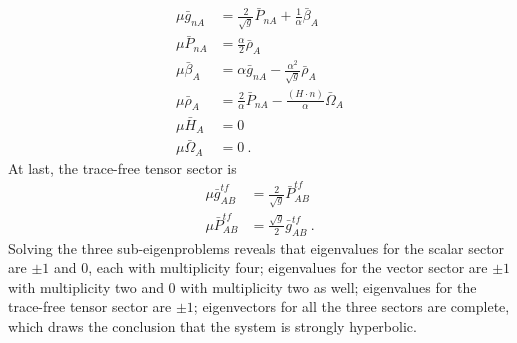 \begin{subequations}
\begin{align}
\mu {\bar g}_{nA} & = \frac{2}{\sqrt{g}}{\bar P}_{nA} + \frac{1}{\alpha}{\bar \beta}_{A}\\
\mu {\bar P}_{nA} & = \frac{\alpha}{2}{\bar \rho}_{A}\\
\mu {\bar \beta}_{A} & = \alpha {\bar g}_{nA} - \frac{\alpha^{2}}{\sqrt{g}}{\bar \rho}_{A}\\
\mu {\bar \rho}_{A} & = \frac{2}{\alpha}{\bar P}_{nA} - \frac{\left(H \cdot n \right)}{\alpha}{\bar \Omega}_{A}\\
\mu {\bar H}_{A} & = 0\\
\mu {\bar \Omega}_{A} & = 0 \ .
\end{align}
\end{subequations}
At last, the trace-free tensor sector is
\begin{subequations}
\begin{align}
\mu {\bar g}^{tf}_{AB} & = \frac{2}{\sqrt{g}}{\bar P}^{tf}_{AB}\\
\mu {\bar P}^{tf}_{AB} & = \frac{\sqrt{g}}{2}{\bar g}^{tf}_{AB} \ .
\end{align}
\end{subequations}
Solving the three sub-eigenproblems reveals that eigenvalues for the scalar sector are $\pm 1$ and 0, each with multiplicity four; eigenvalues for the vector sector are $\pm 1$ with multiplicity two and 0 with multiplicity two as well; eigenvalues for the trace-free tensor sector are $\pm 1$; eigenvectors for all the three sectors are complete, which draws the conclusion that the system is strongly hyperbolic. 

